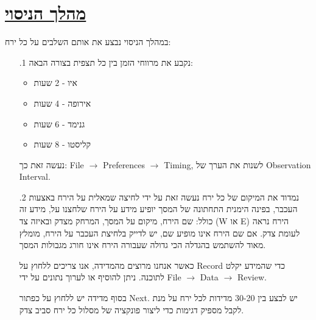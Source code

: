 \documentclass[a4paper, 12pt]{article}
\begin{document}
    \section{\underline{מהלך הניסוי}}
    \begin{flushright}
        במהלך הניסוי נבצע את אותם השלבים על כל ירח:

        \begin{enumerate}
            \item[.1] נקבע את מרווחי הזמן בין כל תצפית בצורה הבאה:
            \begin{itemize}
                \item איו - 2 שעות
                \item אירופה - 4 שעות
                \item גנימד - 6 שעות
                \item קליסטו - 8 שעות
            \end{itemize}
            נעשה זאת כך: \textenglish{File $\rightarrow$ Preferences $\rightarrow$ Timing}, לשנות את הערך של 
            \textenglish{Observation Interval}.
            
            \item[.2] נמדוד את המיקום של כל ירח
            נעשה זאת על ידי לחיצה שמאלית על הירח באצעות העכבר, בפינה הימנית התחתונה של המסך
            יופיע מידע על הירח שלחצנו על, מידע זה כולל: שם הירח, מיקום על המסך, המרחק מצדק
            ובאיזה צד \textenglish{(W או E)} הירח נראה לעומת צדק.
            אם שם הירח אינו מופיע שם, יש לדייק בלחיצת העכבר על הירח, מומלץ מאוד להשתמש
            בהגדלה הכי גדולה שעבורה הירח אינו חורג מגבולות המסך.
            
            כאשר אנחנו מרוצים מהמדידה, אנו צריכים ללחוץ על
            Record כדי שהמידע יקלט לתוכנה.
            ניתן להוסיף או לערוך נתונים על ידי \textenglish{File $\rightarrow$ Data $\rightarrow$ Review}.
            
            בסוף מדידה יש ללחוץ על כפתור \textenglish{Next}. 
            יש לבצע בין 30-20 מדידות לכל ירח על מנת לקבל מספיק דגימות
            כדי ליצור פונקציה של מסלול כל ירח סביב צדק.
        \end{enumerate}



    \end{flushright}

    \pagebreak %
\end{document}
